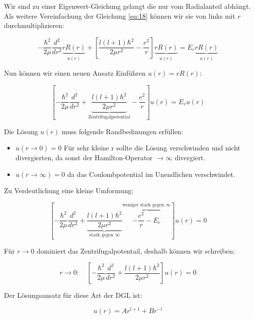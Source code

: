 Wir sind zu einer Eigenwert-Gleichung gelangt die nur vom Radialanteil abhängt. Als weitere Vereinfachung der Gleichung \eqref{eq:18} können wir sie von links mit \(r\) durchmultiplizieren:

\begin{equation}
  \label{eq:19}
   - \frac{\hbar^2}{2\mu}\frac{d^2}{dr^2}\underbrace{r R(r)}_{u(r)} + \left[\frac{l(l+1)\hbar^2}{2\mu r^2}  - \frac{e^2}{r}\right] \underbrace{r R(r)}_{u(r)}   = E_r \underbrace{r R(r)}_{u(r)}
\end{equation}

Nun können wir einen neuen Ansatz Einführen \(u(r) = rR(r)\):

\begin{equation}
  \label{eq:20}
    \left[-\frac{\hbar^2}{2\mu}\frac{d^2}{dr^2} + \underbrace{\frac{l(l+1)\hbar^2}{2\mu r^2}}_{\text{Zentrifugalpotential}}  - \frac{e^2}{r}\right] u(r)   = E_r u(r)
\end{equation}

Die Lösung \(u(r)\) muss folgende Randbedinungen erfüllen:

\begin{itemize}
\item \(u(r \to 0)=0  \) Für sehr kleine r sollte die Lösung verschwinden und nicht divergierten, da sonst der Hamilton-Operator \(\to\infty\) divergiert.
\item  \(u(r \to \infty)=0  \) da das Coulombpotential im Unendlichen verschwindet.
\end{itemize}

Zu Verdeutlichung eine kleine Umformung:

\begin{equation}
  \label{eq:22}
   \left[-\frac{\hbar^2}{2\mu}\frac{d^2}{dr^2} + \underbrace{\frac{l(l+1)\hbar^2}{2\mu r^2}}_{\text{stark gegen }\infty}  \overbrace{- \frac{e^2}{r} - E_r}^{\text{weniger stark gegen }\infty}   \right] u(r)   = 0 
\end{equation}

Für \(r\to 0\) dominiert das Zentrifugalpotentail, deshalb können wir schreiben:

\begin{equation}
  \label{eq:21}
  r\to 0: \quad\left[-\frac{\hbar^2}{2\mu}\frac{d^2}{dr^2}+ \frac{l(l+1)\hbar^2}{2\mu r^2}\right] u(r) = 0
\end{equation}

Der Lösungsansatz für diese Art der DGL ist:

\begin{equation}
  \label{eq:23}
  u(r) = Ar^{l+1}+Br^{-l}
\end{equation}

